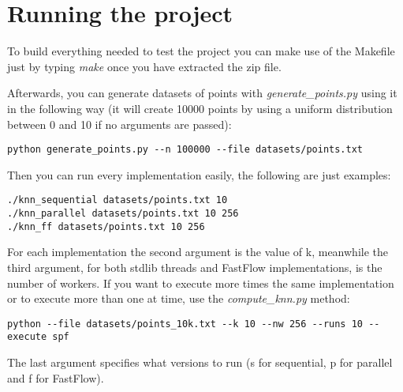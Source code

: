 \section{Running the project}
To build everything needed to test the project you can make use of the Makefile just by typing \textit{make} once you have extracted the zip file.
\vspace{3mm}

Afterwards, you can generate datasets of points with \textit{generate\_points.py} using it in the following way (it will create 10000 points by using a uniform distribution between 0 and 10 if no arguments are passed):
\begin{verbatim}
python generate_points.py --n 100000 --file datasets/points.txt
\end{verbatim}

Then you can run every implementation easily, the following are just examples:
\begin{verbatim}
./knn_sequential datasets/points.txt 10
./knn_parallel datasets/points.txt 10 256
./knn_ff datasets/points.txt 10 256
\end{verbatim}

For each implementation the second argument is the value of k, meanwhile the third argument, for both stdlib threads and FastFlow implementations, is the number of workers.
If you want to execute more times the same implementation or to execute more than one at time, use the \textit{compute\_knn.py} method:
\begin{verbatim}
python --file datasets/points_10k.txt --k 10 --nw 256 --runs 10 --execute spf
\end{verbatim}
The last argument specifies what versions to run (s for sequential, p for parallel and f for FastFlow).
